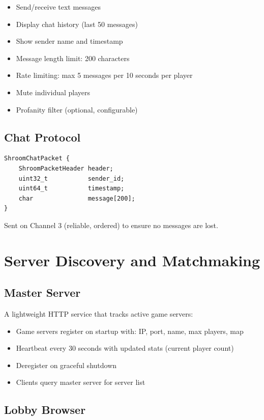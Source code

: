 \documentclass[11pt]{article}
\begin{document}
\begin{itemize}
  \item Send/receive text messages
  \item Display chat history (last 50 messages)
  \item Show sender name and timestamp
  \item Message length limit: 200 characters
  \item Rate limiting: max 5 messages per 10 seconds per player
  \item Mute individual players
  \item Profanity filter (optional, configurable)
\end{itemize}

\subsection{Chat Protocol}

\begin{verbatim}
ShroomChatPacket {
    ShroomPacketHeader header;
    uint32_t           sender_id;
    uint64_t           timestamp;
    char               message[200];
}
\end{verbatim}

Sent on Channel 3 (reliable, ordered) to ensure no messages are lost.

\section{Server Discovery and Matchmaking}

\subsection{Master Server}

A lightweight HTTP service that tracks active game servers:

\begin{itemize}
  \item Game servers register on startup with: IP, port, name, max players, map
  \item Heartbeat every 30 seconds with updated stats (current player count)
  \item Deregister on graceful shutdown
  \item Clients query master server for server list
\end{itemize}

\subsection{Lobby Browser}
\end{document}
